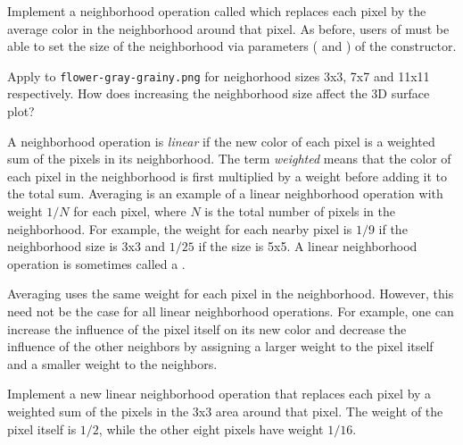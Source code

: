 \documentclass{book}
\begin{document}
\begin{exercise}\label{ex:gray8average}
Implement a neighborhood operation called  which replaces each pixel by the average color in the neighborhood around that pixel. As before, users of  must be able to set the size of the neighborhood via parameters ( and ) of the constructor.

Apply  to \texttt{flower-gray-grainy.png} for neighorhood sizes 3x3, 7x7 and 11x11 respectively. How does increasing the neighborhood size affect the 3D surface plot? 
\end{exercise}

A neighborhood operation is \emph{linear} if the new color of each pixel is a weighted sum of the pixels in its neighborhood. The term \emph{weighted} means that the color of each pixel in the neighborhood is first multiplied by a weight before adding it to the total sum. Averaging is an example of a linear neighborhood operation with weight $1/N$ for each pixel, where $N$ is the total number of pixels in the neighborhood. For example, the weight for each nearby pixel is $1/9$ if the neighborhood size is 3x3 and $1/25$ if the size is 5x5. A linear neighborhood operation is sometimes called a .

Averaging uses the same weight for each pixel in the neighborhood. However, this need not be the case for all linear neighborhood operations. For example, one can increase the influence of the pixel itself on its new color and decrease the influence of the other neighbors by assigning a larger weight to the pixel itself and a smaller weight to the neighbors.

\begin{exercise}\label{ex:diffweights}
Implement a new linear neighborhood operation that replaces each pixel by a weighted sum of the pixels in the 3x3 area around that pixel. The weight of the pixel itself is $1/2$, while the other eight pixels have weight $1/16$.
\end{exercise}
\end{document}
